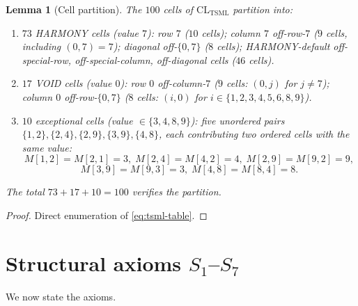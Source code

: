 \documentclass[11pt,reqno]{amsart}
\theoremstyle{plain}
\newtheorem{lemma}[theorem]{Lemma}
\theoremstyle{definition}
\theoremstyle{remark}
\newcommand{\TSML}{\mathrm{TSML}}
\newcommand{\CL}{\mathrm{CL}}
\begin{document}
\begin{lemma}[Cell partition]
\label{lem:partition}
The $100$ cells of $\CL_{\TSML}$ partition into:
\begin{enumerate}
\item $73$ \emph{HARMONY} cells (value $7$): row $7$ ($10$ cells);
column $7$ off-row-$7$ ($9$ cells, including $(0, 7) = 7$); diagonal
off-$\{0, 7\}$ ($8$ cells); HARMONY-default off-special-row,
off-special-column, off-diagonal cells ($46$ cells).
\item $17$ \emph{VOID} cells (value $0$): row $0$ off-column-$7$
($9$ cells: $(0, j)$ for $j \neq 7$); column $0$ off-row-$\{0, 7\}$
($8$ cells: $(i, 0)$ for $i \in \{1, 2, 3, 4, 5, 6, 8, 9\}$).
\item $10$ \emph{exceptional} cells (value $\in \{3, 4, 8, 9\}$):
five unordered pairs $\{1, 2\}, \{2, 4\}, \{2, 9\}, \{3, 9\}, \{4, 8\}$,
each contributing two ordered cells with the same value:
\[
M[1, 2] = M[2, 1] = 3, \;
M[2, 4] = M[4, 2] = 4, \;
M[2, 9] = M[9, 2] = 9,
\]
\[
M[3, 9] = M[9, 3] = 3, \;
M[4, 8] = M[8, 4] = 8.
\]
\end{enumerate}
The total $73 + 17 + 10 = 100$ verifies the partition.
\end{lemma}

\begin{proof}
Direct enumeration of \eqref{eq:tsml-table}.
\end{proof}

\section{Structural axioms $S_{1}$--$S_{7}$}
\label{sec:axioms}

We now state the axioms.
\end{document}
